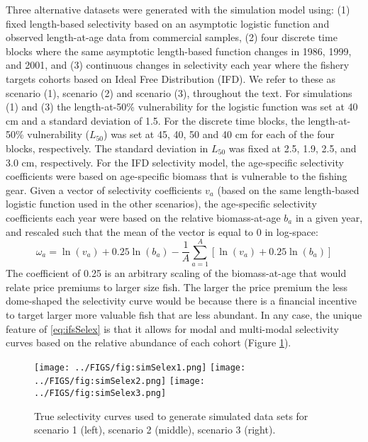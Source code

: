 Three alternative datasets were generated with the simulation model using: (1) fixed length-based selectivity based on an asymptotic logistic function and observed length-at-age data from commercial samples, (2) four discrete time blocks where the same asymptotic length-based function changes in 1986, 1999, and 2001, and (3) continuous changes in selectivity each year where the fishery targets cohorts based on Ideal Free Distribution (IFD).  We refer to these as scenario (1), scenario (2) and scenario (3), throughout the text.  For simulations (1) and (3) the length-at-50\% vulnerability for the logistic function was set at 40 cm and a standard deviation of 1.5.  For the discrete time blocks, the length-at-50\% vulnerability ($L_{50}$) was set at 45, 40, 50 and 40 cm for each of the four blocks, respectively.  The standard deviation in $L_{50}$ was fixed at 2.5, 1.9, 2.5, and 3.0 cm, respectively.  For the IFD selectivity model, the age-specific selectivity coefficients were based on age-specific biomass that is vulnerable to the fishing gear.  Given a vector of selectivity coefficients $v_a$ (based on the same length-based logistic function used in the other scenarios), the age-specific selectivity coefficients each year were based on the relative biomass-at-age $b_a$ in a given year, and rescaled such that the mean of the vector is equal to 0 in log-space:
\begin{equation}\label{eq:ifsSelex}
	\omega_a = \ln(v_a) + 0.25\ln(b_a) - 
	\frac{1}{A}\sum_{a=1}^A \left[ \ln(v_a) + 0.25\ln(b_a)\right]
\end{equation}
The coefficient of 0.25 is an arbitrary scaling of the biomass-at-age that would relate price premiums to larger size fish.  The larger the price premium the less dome-shaped the selectivity curve would be because there is a financial incentive to target larger more valuable fish that are less abundant.  In any case, the unique feature of \eqref{eq:ifsSelex} is that it allows for modal and multi-modal selectivity curves based on the relative abundance of each cohort (Figure \ref{fig:simSelex}).

\begin{figure}[!tbh]
	\begin{center}
		\texttt{[image: ../FIGS/fig:simSelex1.png]}
		\hspace{-1.25cm}
		\texttt{[image: ../FIGS/fig:simSelex2.png]}
		\hspace{-1.25cm}
		\texttt{[image: ../FIGS/fig:simSelex3.png]}
	\end{center}
	\caption{True selectivity curves used to generate simulated data sets for scenario 1 (left), scenario 2 (middle), scenario 3 (right).}
	\label{fig:simSelex}
\end{figure}

